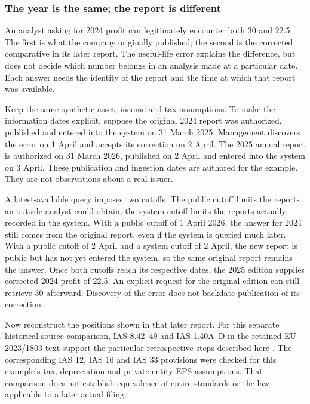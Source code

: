 \subsubsection{The year is the same; the report is different}
\label{sec:comparative-report-editions}

An analyst asking for 2024 profit can legitimately encounter both 30 and
22.5. The first is what the company originally published; the second is the
corrected comparative in its later report. The useful-life error explains the
difference, but does not decide which number belongs in an analysis made at
a particular date. Each answer needs the identity of the report and the time
at which that report was available.

Keep the same synthetic asset, income and tax assumptions. To make the
information dates explicit, suppose the original 2024 report was authorized,
published and entered into the system on 31 March 2025. Management discovers
the error on 1 April and accepts its correction on 2 April. The 2025 annual
report is authorized on 31 March 2026, published on 2 April and entered into
the system on 3 April. These publication and ingestion dates are authored for
the example. They are not observations about a real issuer.

A latest-available query imposes two cutoffs. The public cutoff limits the
reports an outside analyst could obtain; the system cutoff limits the reports
actually recorded in the system. With a public cutoff of 1 April 2026, the
answer for 2024 still comes from the original report, even if the system is
queried much later. With a public cutoff of 2 April and a system cutoff of
2 April, the new report is public but has not yet entered the system, so the
same original report remains the answer. Once both cutoffs reach its respective
dates, the 2025 edition supplies corrected 2024 profit of 22.5. An explicit
request for the original edition can still retrieve 30 afterward. Discovery
of the error does not backdate publication of its correction.

Now reconstruct the positions shown in that later report. For this separate
historical source comparison, IAS 8.42--49 and IAS 1.40A--D in the retained
EU 2023/1803 text support the particular retrospective steps described here
\citep{eu20231803}. The corresponding IAS 12, IAS 16 and IAS 33 provisions
were checked for this example's tax, depreciation and private-entity EPS
assumptions. That comparison does not establish equivalence of entire
standards or the law applicable to a later actual filing.

